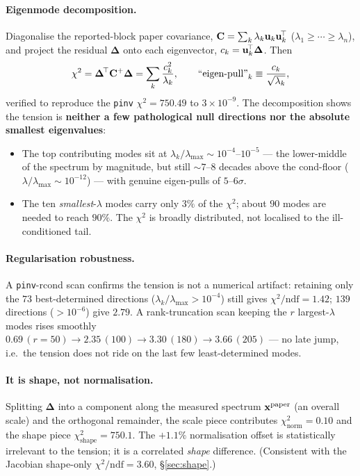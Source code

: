 \paragraph{Eigenmode decomposition.}
Diagonalise the reported-block paper covariance,
$\mathbf{C}=\sum_{k}\lambda_{k}\mathbf{u}_{k}\mathbf{u}_{k}^{\!\top}$
($\lambda_{1}\!\ge\!\cdots\!\ge\!\lambda_{n}$), and project the residual
$\boldsymbol{\Delta}$ onto each eigenvector, $c_{k}=\mathbf{u}_{k}^{\!\top}\boldsymbol{\Delta}$.
Then
\begin{equation}
\chi^{2}=\boldsymbol{\Delta}^{\!\top}\mathbf{C}^{+}\boldsymbol{\Delta}
=\sum_{k}\frac{c_{k}^{2}}{\lambda_{k}},
\qquad
\text{``eigen-pull''}_{k}\equiv\frac{c_{k}}{\sqrt{\lambda_{k}}},
\end{equation}
verified to reproduce the \texttt{pinv} $\chi^{2}=750.49$ to $3\times10^{-9}$.
The decomposition shows the tension is \textbf{neither a few pathological
null directions nor the absolute smallest eigenvalues}:
\begin{itemize}[nosep]
  \item The top contributing modes sit at $\lambda_{k}/\lambda_{\max}\sim
        10^{-4}$--$10^{-5}$ --- the lower-middle of the spectrum by
        magnitude, but still $\sim7$--$8$ decades above the cond-floor
        ($\lambda/\lambda_{\max}\sim10^{-12}$) --- with genuine eigen-pulls
        of $5$--$6\sigma$.
  \item The ten \emph{smallest}-$\lambda$ modes carry only $3\%$ of the
        $\chi^{2}$; about $90$ modes are needed to reach $90\%$. The
        $\chi^{2}$ is broadly distributed, not localised to the
        ill-conditioned tail.
\end{itemize}

\paragraph{Regularisation robustness.}
A \texttt{pinv}-rcond scan confirms the tension is not a numerical artifact:
retaining only the $73$ best-determined directions
($\lambda_{k}/\lambda_{\max}>10^{-4}$) still gives $\chi^{2}/\mathrm{ndf}=1.42$;
$139$ directions ($>10^{-6}$) give $2.79$. A rank-truncation scan keeping the
$r$ largest-$\lambda$ modes rises smoothly $0.69\,(r{=}50)\to2.35\,(100)\to
3.30\,(180)\to3.66\,(205)$ --- no late jump, i.e.\ the tension does not ride on
the last few least-determined modes.

\paragraph{It is shape, not normalisation.}
Splitting $\boldsymbol{\Delta}$ into a component along the measured
spectrum $\mathbf{x}^{\text{paper}}$ (an overall scale) and the orthogonal
remainder, the scale piece contributes $\chi^{2}_{\mathrm{norm}}=0.10$ and the
shape piece $\chi^{2}_{\text{shape}}=750.1$. The $+1.1\%$ normalisation
offset is statistically irrelevant to the tension; it is a correlated
\emph{shape} difference. (Consistent with the Jacobian shape-only
$\chi^{2}/\mathrm{ndf}=3.60$, \S\ref{sec:shape}.)

